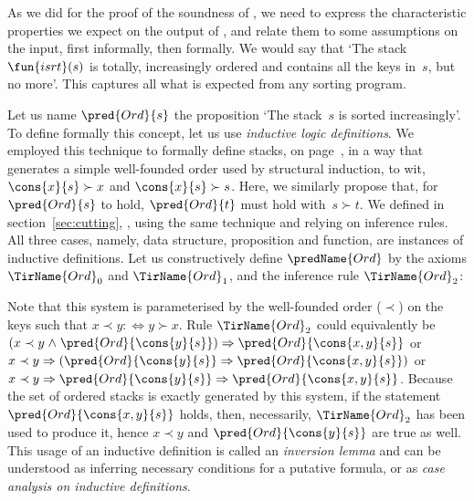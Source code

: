As we did for the proof of the soundness of 
, we need to express the characteristic
properties we expect on the output of , and relate them to
some assumptions on the input, first informally, then formally. We
would say that `The stack \(\fun{isrt}(s)\)
is totally, increasingly ordered and contains all the keys in~\(s\),
but no more'.  This captures all what is expected from any sorting
program.

Let us name \(\pred{Ord}{s}\) the
proposition `The stack~\(s\) is sorted increasingly'. To define
formally this concept, let us use \emph{inductive logic
  definitions}. We employed this
technique to formally define stacks, on page~\pageref{def:stack}, in a
way that generates a simple well\hyp{}founded order used by structural
induction, to wit, \(\cons{x}{s} \succ x\) and \(\cons{x}{s} \succ
s\). Here, we similarly propose that, for \(\pred{Ord}{s}\) to hold,
\(\pred{Ord}{t}\) must hold with~\(s \succ t\). We defined 
in section~\ref{sec:cutting}, , using the same
technique and relying on inference rules. All three cases, namely,
data structure, proposition and function, are instances of inductive
definitions. Let us constructively define \(\predName{Ord}\) by the
axioms \(\TirName{Ord}_0\) and \(\TirName{Ord}_1\), and the inference
rule \(\TirName{Ord}_2\):\label{def:Ord}
Note that this system is parameterised by the well\hyp{}founded order
(\(\prec\)) on the keys such that \(x \prec y :\Leftrightarrow y \succ
x\). Rule \(\TirName{Ord}_2\) could equivalently be \((x \prec y
\mathrel{\wedge} \pred{Ord}{\cons{y}{s}}) \Rightarrow
\pred{Ord}{\cons{x,y}{s}}\) or \(x \prec y \Rightarrow
(\pred{Ord}{\cons{y}{s}} \Rightarrow \pred{Ord}{\cons{x,y}{s}})\) or
\(x \prec y \Rightarrow \pred{Ord}{\cons{y}{s}} \Rightarrow
\pred{Ord}{\cons{x,y}{s}}\). Because the set of ordered stacks is
exactly generated by this system, if the statement
\(\pred{Ord}{\cons{x,y}{s}}\) holds, then, necessarily,
\(\TirName{Ord}_2\) has been used to produce it, hence \(x \prec y\)
and \(\pred{Ord}{\cons{y}{s}}\) are true as well. This usage of an
inductive definition is called an \emph{inversion
  lemma} and can be understood as
inferring necessary conditions for a putative formula, or as
\emph{case analysis on inductive definitions}.


